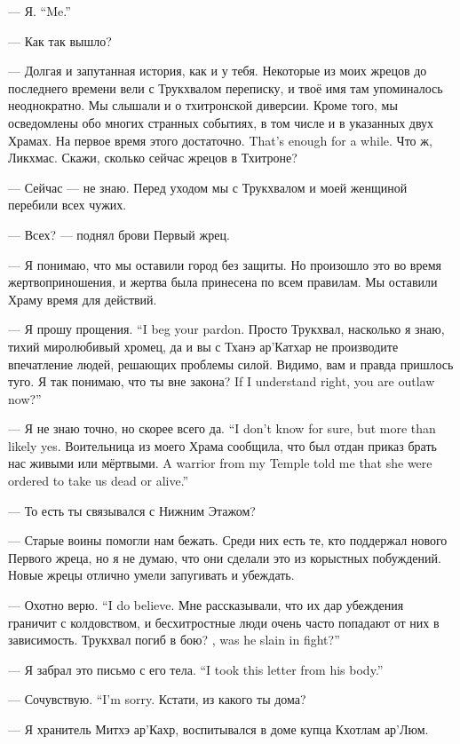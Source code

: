 {--- Я.}
{``Me.''}

--- Как так вышло?

--- Долгая и запутанная история, как и у тебя.
Некоторые из моих жрецов до последнего времени вели с Трукхвалом переписку, и твоё имя там упоминалось неоднократно.
Мы слышали и о тхитронской диверсии.
Кроме того, мы осведомлены обо многих странных событиях, в том числе и в указанных двух Храмах.
{На первое время этого достаточно.}
{That's enough for a while.}
Что ж, Ликхмас.
Скажи, сколько сейчас жрецов в Тхитроне?

--- Сейчас --- не знаю.
Перед уходом мы с Трукхвалом и моей женщиной перебили всех чужих.

--- Всех? --- поднял брови Первый жрец.

--- Я понимаю, что мы оставили город без защиты.
Но произошло это во время жертвоприношения, и жертва была принесена по всем правилам.
Мы оставили Храму время для действий.

{--- Я прошу прощения.}
{``I beg your pardon.}
Просто Трукхвал, насколько я знаю, тихий миролюбивый хромец, да и вы с Тханэ ар'Катхар не производите впечатление людей, решающих проблемы силой.
Видимо, вам и правда пришлось туго.
{Я так понимаю, что ты вне закона?}
{If I understand right, you are outlaw now?''}

{--- Я не знаю точно, но скорее всего да.}
{``I don't know for sure, but more than likely yes.}
{Воительница из моего Храма сообщила, что был отдан приказ брать нас живыми или мёртвыми.}
{A warrior from my Temple told me that she were ordered to take us dead or alive.''}

--- То есть ты связывался с Нижним Этажом?

--- Старые воины помогли нам бежать.
Среди них есть те, кто поддержал нового Первого жреца, но я не думаю, что они сделали это из корыстных побуждений.
Новые жрецы отлично умели запугивать и убеждать.

{--- Охотно верю.}
{``I do believe.}
Мне рассказывали, что их дар убеждения граничит с колдовством, и бесхитростные люди очень часто попадают от них в зависимость.
{Трукхвал погиб в бою?}
{\Trukchual, was he slain in fight?''}

{--- Я забрал это письмо с его тела.}
{``I took this letter from his body.''}

{--- Сочувствую.}
{``I'm sorry.}
Кстати, из какого ты дома?

--- Я хранитель Митхэ ар'Кахр, воспитывался в доме купца Кхотлам ар'Люм.

